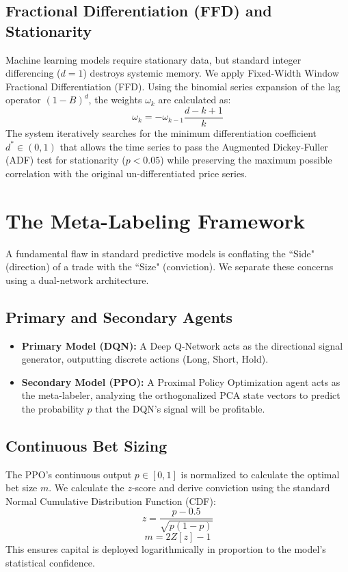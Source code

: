 \documentclass[12pt, a4paper]{article}
\begin{document}
\subsection{Fractional Differentiation (FFD) and Stationarity}
Machine learning models require stationary data, but standard integer differencing ($d=1$) destroys systemic memory. We apply Fixed-Width Window Fractional Differentiation (FFD). Using the binomial series expansion of the lag operator $(1-B)^d$, the weights $\omega_k$ are calculated as:
$$ \omega_k = - \omega_{k-1} \frac{d - k + 1}{k} $$
The system iteratively searches for the minimum differentiation coefficient $d^* \in (0, 1)$ that allows the time series to pass the Augmented Dickey-Fuller (ADF) test for stationarity ($p < 0.05$) while preserving the maximum possible correlation with the original un-differentiated price series.

\section{The Meta-Labeling Framework}
A fundamental flaw in standard predictive models is conflating the ``Side" (direction) of a trade with the ``Size" (conviction). We separate these concerns using a dual-network architecture.

\subsection{Primary and Secondary Agents}
\begin{itemize}
    \item \textbf{Primary Model (DQN):} A Deep Q-Network acts as the directional signal generator, outputting discrete actions (Long, Short, Hold).
    \item \textbf{Secondary Model (PPO):} A Proximal Policy Optimization agent acts as the meta-labeler, analyzing the orthogonalized PCA state vectors to predict the probability $p$ that the DQN's signal will be profitable.
\end{itemize}

\subsection{Continuous Bet Sizing}
The PPO's continuous output $p \in [0, 1]$ is normalized to calculate the optimal bet size $m$. We calculate the $z$-score and derive conviction using the standard Normal Cumulative Distribution Function (CDF):
$$ z = \frac{p - 0.5}{\sqrt{p(1-p)}} $$
$$ m = 2Z[z] - 1 $$
This ensures capital is deployed logarithmically in proportion to the model's statistical confidence.
\end{document}
